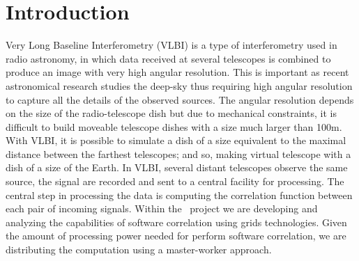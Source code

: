 \section{Introduction}
Very Long Baseline Interferometry (VLBI) \cite{VLBIbook} is a type of
interferometry used in radio astronomy, in which data received at
several telescopes is combined to produce an image with very high
angular resolution. 
This is important as recent astronomical research studies the deep-sky 
thus requiring high angular
resolution to capture all the details of the observed sources.
The angular resolution depends on the size of
the radio-telescope dish but due to mechanical constraints, it 
is difficult to build moveable telescope dishes with a size much
larger than 100m. With VLBI, it is possible to simulate a dish of a size 
equivalent to the maximal distance between the farthest telescopes; and
so, making virtual telescope with
a dish of a size of the Earth. In VLBI, several distant telescopes observe the same source, the signal are recorded and sent to a central facility for processing. The central step in processing the data is computing the correlation function between each pair of incoming signals. Within
the \scarie\ project we are developing and analyzing the capabilities
of software correlation using grids technologies. Given the amount of 
processing power needed for perform software correlation, we are distributing 
the computation using a master-worker approach. 

